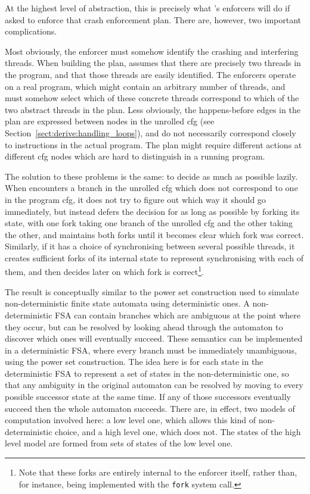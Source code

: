 At the highest level of abstraction, this is precisely what
{\implementation}'s enforcers will do if asked to enforce that crash
enforcement plan.  There are, however, two important complications.

Most obviously, the enforcer must somehow identify the crashing and
interfering threads.  When building the plan, {\technique} assumes
that there are precisely two threads in the program, and that those
threads are easily identified.  The enforcers operate on a real
program, which might contain an arbitrary number of threads, and must
somehow select which of these concrete threads correspond to which of
the two abstract threads in the plan.  Less obviously, the
happens-before edges in the plan are expressed between nodes in the
unrolled \gls{cfg} (see Section~\ref{sect:derive:handling_loops}), and do
not necessarily correspond closely to instructions in the actual
program.  The plan might require different actions at different \gls{cfg}
nodes which are hard to distinguish in a running program.

The solution to these problems is the same: to decide as much as
possible lazily.  When {\implementation} encounters a branch in the
unrolled \gls{cfg} which does not correspond to one in the program \gls{cfg}, it
does not try to figure out which way it should go immediately, but
instead defers the decision for as long as possible by forking its
state, with one fork taking one branch of the unrolled \gls{cfg} and the
other taking the other, and maintains both forks until it becomes
clear which fork was correct.  Similarly, if it has a choice of
synchronising between several possible threads, it creates sufficient
forks of its internal state to represent synchronising with each of
them, and then decides later on which fork is correct\footnote{Note
  that these forks are entirely internal to the enforcer itself,
  rather than, for instance, being implemented with the \texttt{fork}
  system call.}.

The result is conceptually similar to the power set construction used
to simulate non-deterministic finite state automata using
deterministic ones\needCite{}.  A non-deterministic FSA can contain
branches which are ambiguous at the point where they occur, but can be
resolved by looking ahead through the automaton to discover which ones
will eventually succeed.  These semantics can be implemented in a
deterministic FSA, where every branch must be immediately unambiguous,
using the power set construction.  The idea here is for each state in
the deterministic FSA to represent a set of states in the
non-deterministic one, so that any ambiguity in the original automaton
can be resolved by moving to every possible successor state at the
same time.  If any of those successors eventually succeed then the
whole automaton succeeds.  There are, in effect, two models of
computation involved here: a low level one, which allows this kind of
non-deterministic choice, and a high level one, which does not.  The
states of the high level model are formed from sets of states of the
low level one.

